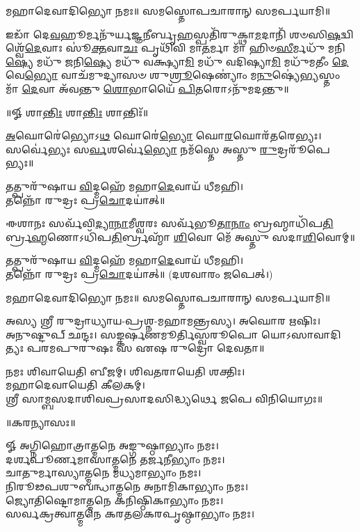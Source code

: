𑌮𑌹𑌾𑌦𑍇𑌵𑌾𑌦𑌿𑌭𑍍𑌯𑍋 𑌨𑌮𑌃॥ 𑌸𑌮𑌸𑍍𑌤𑍋𑌪𑌚𑌾𑌰𑌾𑌨𑍍 𑌸𑌮𑌰𑍍𑌪𑌯𑌾𑌮𑌿॥

𑌇𑌡𑌾᳴ 𑌦𑍇\-\ul{𑌵}\-𑌹𑍂𑌰𑍍𑌮𑌨𑍁᳴𑌰𑍍𑌯\-\ul{𑌜𑍍𑌞}\-𑌨𑍀𑌰𑍍𑌬𑍃\-\ul{𑌹}\-𑌸𑍍𑌪𑌤𑌿᳴𑌰𑍁𑌕𑍍𑌥𑌾\-\ul{𑌮}\-𑌦𑌾𑌨𑌿᳴ 𑌶𑍞𑌸𑌿\-\ul{𑌷}\-𑌦𑍍𑌵𑌿𑌶𑍍𑌵𑍇᳴\-\ul{𑌦𑍇}\-𑌵𑌾𑌃 𑌸𑍂॑\-\ul{𑌕𑍍𑌤}\-𑌵𑌾\-\ul{𑌚𑌃} 𑌪𑍃𑌥𑌿᳴𑌵𑌿 𑌮𑌾\-\ul{𑌤}\-𑌰𑍍𑌮𑌾 𑌮𑌾᳴ 𑌹𑌿𑍞\-\ul{𑌸𑍀}\-𑌰𑍍𑌮𑌧𑍁᳴ 𑌮𑌨𑌿\-\ul{𑌷𑍍𑌯𑍇} 𑌮𑌧𑍁᳴ 𑌜𑌨𑌿\-\ul{𑌷𑍍𑌯𑍇} 𑌮𑌧𑍁᳴ 𑌵𑌕𑍍𑌷𑍍𑌯𑌾\-\ul{𑌮𑌿} 𑌮𑌧𑍁᳴ 𑌵𑌦𑌿𑌷𑍍𑌯𑌾\-\ul{𑌮𑌿} 𑌮𑌧𑍁᳴𑌮𑌤𑍀𑌂 \ul{𑌦𑍇}\-𑌵𑍇\-\ul{𑌭𑍍𑌯𑍋} 𑌵𑌾𑌚᳴𑌮𑍁𑌦𑍍𑌯𑌾𑌸𑍞 𑌶𑍁\-\ul{𑌶𑍍𑌰𑍂}\-𑌷𑍇𑌣𑍍𑌯𑌾𑌂॑ 𑌮\-\ul{𑌨𑍁}\-𑌷𑍍𑌯𑍇॑\-\ul{𑌭𑍍𑌯}\-𑌸𑍍𑌤𑌂 𑌮𑌾᳴ \ul{𑌦𑍇}\-𑌵𑌾 𑌅᳴𑌵𑌨𑍍𑌤𑍁 \ul{𑌶𑍋}\-𑌭𑌾𑌯𑍈᳴ \ul{𑌪𑌿}\-𑌤𑌰𑍋𑌽𑌨𑍁᳴𑌮𑌦𑌨𑍍𑌤𑍁॥ 

\centerline{॥𑍐 𑌶𑌾\-\ul{𑌨𑍍𑌤𑌿𑌃} 𑌶𑌾\-\ul{𑌨𑍍𑌤𑌿𑌃} 𑌶𑌾𑌨𑍍𑌤𑌿𑌃᳴॥}

{\small \closesection}

\-\ul{𑌅}\-𑌘𑍋𑌰𑍇॑𑌭𑍍𑌯𑍋𑌽\-\ul{𑌥} 𑌘𑍋𑌰𑍇॑\-\ul{𑌭𑍍𑌯𑍋} 𑌘𑍋\-\ul{𑌰}\-𑌘𑍋𑌰᳴𑌤𑌰𑍇𑌭𑍍𑌯𑌃।\\
𑌸𑌰𑍍𑌵𑍇॑𑌭𑍍𑌯𑌃 𑌸\-\ul{𑌰𑍍𑌵}\-𑌶𑌰𑍍𑌵𑍇॑\-\ul{𑌭𑍍𑌯𑍋} 𑌨𑌮᳴𑌸𑍍𑌤𑍇 𑌅𑌸𑍍𑌤𑍁 \ul{𑌰𑍁}\-𑌦𑍍𑌰𑌰𑍂᳴𑌪𑍇𑌭𑍍𑌯𑌃॥

𑌤𑌤𑍍𑌪𑍁𑌰𑍁᳴𑌷𑌾𑌯 \ul{𑌵𑌿}\-𑌦𑍍𑌮𑌹𑍇᳴ 𑌮𑌹𑌾\-\ul{𑌦𑍇}\-𑌵𑌾𑌯᳴ 𑌧𑍀𑌮𑌹𑌿।\\
𑌤𑌨𑍍𑌨𑍋᳴ 𑌰𑍁𑌦𑍍𑌰𑌃 𑌪𑍍𑌰\-\ul{𑌚𑍋}\-𑌦𑌯𑌾॑𑌤𑍍॥

𑌈𑌶𑌾𑌨𑌃 𑌸𑌰𑍍𑌵᳴𑌵𑌿\-\ul{𑌦𑍍𑌯𑌾}\-\-\ul{𑌨𑌾}\-𑌮𑍀𑌶𑍍𑌵𑌰𑌃 𑌸𑌰𑍍𑌵᳴𑌭𑍂\-\ul{𑌤𑌾}\-\-\ul{𑌨𑌾𑌂} 𑌬𑍍𑌰𑌹𑍍𑌮𑌾𑌧𑌿᳴𑌪\-\ul{𑌤𑌿}\-𑌰𑍍𑌬𑍍𑌰\-\ul{𑌹𑍍𑌮}\-𑌣𑍋\-𑌽𑌧𑌿᳴𑌪\-\ul{𑌤𑌿}\-𑌰𑍍𑌬𑍍𑌰𑌹𑍍𑌮𑌾᳴ \ul{𑌶𑌿}\-𑌵𑍋 𑌮𑍇᳴ 𑌅𑌸𑍍𑌤𑍁 𑌸𑌦𑌾\-\ul{𑌶𑌿}\-𑌵𑍋𑌮𑍍॥

𑌤𑌤𑍍𑌪𑍁𑌰𑍁᳴𑌷𑌾𑌯 \ul{𑌵𑌿}\-𑌦𑍍𑌮𑌹𑍇᳴ 𑌮𑌹𑌾\-\ul{𑌦𑍇}\-𑌵𑌾𑌯᳴ 𑌧𑍀𑌮𑌹𑌿।\\
𑌤𑌨𑍍𑌨𑍋᳴ 𑌰𑍁𑌦𑍍𑌰𑌃 𑌪𑍍𑌰\-\ul{𑌚𑍋}\-𑌦𑌯𑌾॑𑌤𑍍॥ (𑌦𑌶𑌵𑌾𑌰𑌂 𑌜𑌪𑍇𑌤𑍍।)

𑌮𑌹𑌾𑌦𑍇𑌵𑌾𑌦𑌿𑌭𑍍𑌯𑍋 𑌨𑌮𑌃॥ 𑌸𑌮𑌸𑍍𑌤𑍋𑌪𑌚𑌾𑌰𑌾𑌨𑍍 𑌸𑌮𑌰𑍍𑌪𑌯𑌾𑌮𑌿॥

{\small \closesection}


{\small \closesection}


𑌅𑌸𑍍𑌯 𑌶𑍍𑌰𑍀 𑌰𑍁𑌦𑍍𑌰𑌾𑌧𑍍𑌯𑌾𑌯-𑌪𑍍𑌰𑌶𑍍𑌨-𑌮𑌹𑌾𑌮𑌨𑍍𑌤𑍍𑌰𑌸𑍍𑌯। 𑌅𑌘𑍋𑌰 𑌋𑌷𑌿𑌃।\\
𑌅𑌨𑍁𑌷𑍍𑌟𑍁𑌪𑍍 𑌛𑌨𑍍𑌦𑌃। 𑌸𑌙𑍍𑌕𑌰𑍍𑌷𑌣𑌮𑍂𑌰𑍍𑌤𑌿𑌸𑍍𑌵𑌰𑍂𑌪𑍋 𑌯𑍋𑌽𑌸𑌾𑌵𑌾𑌦𑌿𑌤𑍍𑌯𑌃 𑌪𑌰𑌮𑌪𑍁𑌰𑍁𑌷𑌃 𑌸 𑌏𑌷 𑌰𑍁𑌦𑍍𑌰𑍋 𑌦𑍇𑌵𑌤𑌾॥

𑌨𑌮𑌃 𑌶𑌿𑌵𑌾𑌯𑍇𑌤𑌿 𑌬𑍀𑌜𑌮𑍍। 𑌶𑌿𑌵𑌤𑌰𑌾𑌯𑍇𑌤𑌿 𑌶𑌕𑍍𑌤𑌿𑌃।\\
𑌮𑌹𑌾𑌦𑍇𑌵𑌾𑌯𑍇𑌤𑌿 𑌕𑍀𑌲𑌕𑌮𑍍।\\
𑌶𑍍𑌰𑍀 𑌸𑌾𑌮𑍍𑌬𑌸𑌦𑌾𑌶𑌿𑌵𑌪𑍍𑌰𑌸𑌾𑌦𑌸𑌿𑌦𑍍𑌧𑍍𑌯𑌰𑍍𑌥𑍇 𑌜𑌪𑍇 𑌵𑌿𑌨𑌿𑌯𑍋𑌗𑌃॥\\


\centerline{॥𑌕𑌰𑌨𑍍𑌯𑌾𑌸𑌃॥}
𑍐 𑌅𑌗𑍍𑌨𑌿𑌹𑍋𑌤𑍍𑌰𑌾𑌤𑍍𑌮𑌨𑍇 𑌅𑌙𑍍𑌗𑍁𑌷𑍍𑌠𑌾𑌭𑍍𑌯𑌾𑌂 𑌨𑌮𑌃।\\
𑌦𑌰𑍍𑌶𑌪𑍂𑌰𑍍𑌣𑌮𑌾𑌸𑌾𑌤𑍍𑌮𑌨𑍇 𑌤𑌰𑍍𑌜𑌨𑍀𑌭𑍍𑌯𑌾𑌂 𑌨𑌮𑌃।\\
𑌚𑌾𑌤𑍁𑌰𑍍𑌮𑌾𑌸𑍍𑌯𑌾𑌤𑍍𑌮𑌨𑍇 𑌮𑌧𑍍𑌯𑌮𑌾𑌭𑍍𑌯𑌾𑌂 𑌨𑌮𑌃।\\
𑌨𑌿𑌰𑍂𑌢𑌪𑌶𑍁𑌬𑌨𑍍𑌧𑌾𑌤𑍍𑌮𑌨𑍇 𑌅𑌨𑌾𑌮𑌿𑌕𑌾𑌭𑍍𑌯𑌾𑌂 𑌨𑌮𑌃।\\
𑌜𑍍𑌯𑍋𑌤𑌿𑌷𑍍𑌟𑍋𑌮𑌾𑌤𑍍𑌮𑌨𑍇 𑌕𑌨𑌿𑌷𑍍𑌠𑌿𑌕𑌾𑌭𑍍𑌯𑌾𑌂 𑌨𑌮𑌃।\\
𑌸𑌰𑍍𑌵𑌕𑍍𑌰𑌤𑍍𑌵𑌾𑌤𑍍𑌮𑌨𑍇 𑌕𑌰𑌤𑌲𑌕𑌰𑌪𑍃𑌷𑍍𑌠𑌾𑌭𑍍𑌯𑌾𑌂  𑌨𑌮𑌃।\\


